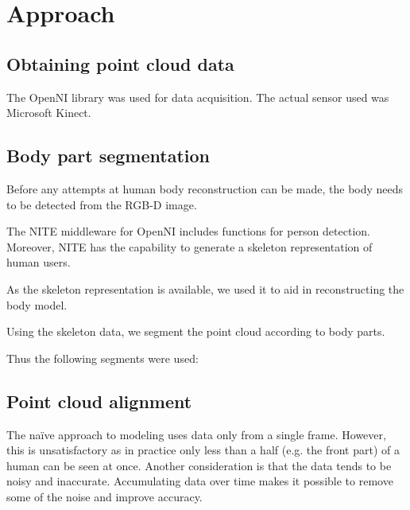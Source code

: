 \chapter{Approach}

\section{Obtaining point cloud data}


The OpenNI library \citep{OpenNI}
was used for data acquisition. The actual sensor used was Microsoft Kinect.

\section{Body part segmentation}

Before any attempts at human body reconstruction can be made, the body needs to be detected from the RGB-D image. %

The NITE middleware for OpenNI \citep{NITE}
includes functions for person detection. Moreover, NITE has the capability to generate a skeleton representation of human users.

As the skeleton representation is available, we used it to aid in reconstructing the body model.

Using the skeleton data, we segment the point cloud according to body parts.

 Thus the following segments were used:


\section{Point cloud alignment}

The naïve approach to modeling uses data only from a single frame. However, this is unsatisfactory as in practice only less than a half (e.g. the front part) of a human can be seen at once. Another consideration is that the data tends to be noisy and inaccurate. Accumulating data over time makes it possible to remove some of the noise and improve accuracy.

